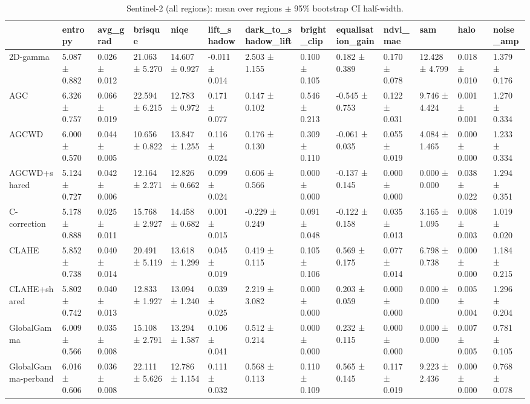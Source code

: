 \begin{table}[t]
\caption{Sentinel-2 (all regions): mean over regions $\pm$ 95\% bootstrap CI half-width.}
\label{tab:s2_summary_all}
\begin{tabular}{lllllllllllll}
\toprule
 & entropy & avg\_grad & brisque & niqe & lift\_shadow & dark\_to\_shadow\_lift & bright\_clip & equalisation\_gain & ndvi\_mae & sam & halo & noise\_amp \\
\midrule
2D-gamma & 5.087 ± 0.882 & 0.026 ± 0.012 & 21.063 ± 5.270 & 14.607 ± 0.927 & -0.011 ± 0.014 & 2.503 ± 1.155 & 0.100 ± 0.105 & 0.182 ± 0.389 & 0.170 ± 0.078 & 12.428 ± 4.799 & 0.018 ± 0.010 & 1.379 ± 0.176 \\
AGC & 6.326 ± 0.757 & 0.066 ± 0.019 & 22.594 ± 6.215 & 12.783 ± 0.972 & 0.171 ± 0.077 & 0.147 ± 0.102 & 0.546 ± 0.213 & -0.545 ± 0.753 & 0.122 ± 0.031 & 9.746 ± 4.424 & 0.001 ± 0.001 & 1.270 ± 0.334 \\
AGCWD & 6.000 ± 0.570 & 0.044 ± 0.005 & 10.656 ± 0.822 & 13.847 ± 1.255 & 0.116 ± 0.024 & 0.176 ± 0.130 & 0.309 ± 0.110 & -0.061 ± 0.035 & 0.055 ± 0.019 & 4.084 ± 1.465 & 0.000 ± 0.000 & 1.233 ± 0.334 \\
AGCWD+shared & 5.124 ± 0.727 & 0.042 ± 0.006 & 12.164 ± 2.271 & 12.826 ± 0.662 & 0.099 ± 0.024 & 0.606 ± 0.566 & 0.000 ± 0.000 & -0.137 ± 0.145 & 0.000 ± 0.000 & 0.000 ± 0.000 & 0.038 ± 0.022 & 1.294 ± 0.351 \\
C-correction & 5.178 ± 0.888 & 0.025 ± 0.011 & 15.768 ± 2.927 & 14.458 ± 0.682 & 0.001 ± 0.015 & -0.229 ± 0.249 & 0.091 ± 0.048 & -0.122 ± 0.158 & 0.035 ± 0.013 & 3.165 ± 1.095 & 0.008 ± 0.003 & 1.019 ± 0.020 \\
CLAHE & 5.852 ± 0.738 & 0.040 ± 0.014 & 20.491 ± 5.119 & 13.618 ± 1.299 & 0.045 ± 0.019 & 0.419 ± 0.115 & 0.105 ± 0.106 & 0.569 ± 0.175 & 0.077 ± 0.014 & 6.798 ± 0.738 & 0.000 ± 0.000 & 1.184 ± 0.215 \\
CLAHE+shared & 5.802 ± 0.742 & 0.040 ± 0.013 & 12.833 ± 1.927 & 13.094 ± 1.240 & 0.039 ± 0.025 & 2.219 ± 3.082 & 0.000 ± 0.000 & 0.203 ± 0.059 & 0.000 ± 0.000 & 0.000 ± 0.000 & 0.005 ± 0.004 & 1.296 ± 0.204 \\
GlobalGamma & 6.009 ± 0.566 & 0.035 ± 0.008 & 15.108 ± 2.791 & 13.294 ± 1.587 & 0.106 ± 0.041 & 0.512 ± 0.214 & 0.000 ± 0.000 & 0.232 ± 0.115 & 0.000 ± 0.000 & 0.000 ± 0.000 & 0.007 ± 0.005 & 0.781 ± 0.105 \\
GlobalGamma-perband & 6.016 ± 0.606 & 0.036 ± 0.008 & 22.111 ± 5.626 & 12.786 ± 1.154 & 0.111 ± 0.032 & 0.568 ± 0.113 & 0.110 ± 0.109 & 0.565 ± 0.145 & 0.117 ± 0.019 & 9.223 ± 2.436 & 0.000 ± 0.000 & 0.768 ± 0.078 \\

\end{tabular}
\end{table}
